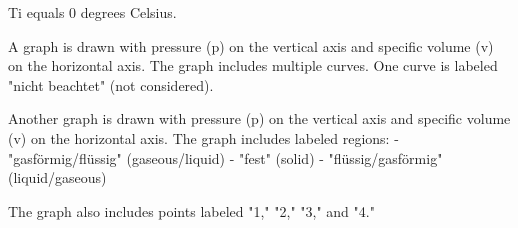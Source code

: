 Ti equals 0 degrees Celsius.  

A graph is drawn with pressure (p) on the vertical axis and specific volume (v) on the horizontal axis. The graph includes multiple curves. One curve is labeled "nicht beachtet" (not considered).  

Another graph is drawn with pressure (p) on the vertical axis and specific volume (v) on the horizontal axis. The graph includes labeled regions:  
- "gasförmig/flüssig" (gaseous/liquid)  
- "fest" (solid)  
- "flüssig/gasförmig" (liquid/gaseous)  

The graph also includes points labeled "1," "2," "3," and "4."